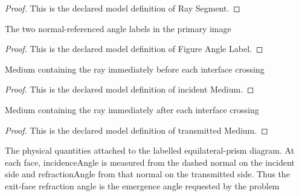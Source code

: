 \begin{proof}
  This is the declared model definition of Ray Segment.
\end{proof}
\begin{definition}
  \label{def:physics:phyx-mini-0146:phyxminiproblems-problemphyxmini0146-figureanglelabel}
  The two normal-referenced angle labels in the primary image
\end{definition}
\begin{proof}
  This is the declared model definition of Figure Angle Label.
\end{proof}
\begin{definition}
  \label{def:physics:phyx-mini-0146:phyxminiproblems-problemphyxmini0146-incidentmedium}
  Medium containing the ray immediately before each interface crossing
\end{definition}
\begin{proof}
  This is the declared model definition of incident Medium.
\end{proof}
\begin{definition}
  \label{def:physics:phyx-mini-0146:phyxminiproblems-problemphyxmini0146-transmittedmedium}
  Medium containing the ray immediately after each interface crossing
\end{definition}
\begin{proof}
  This is the declared model definition of transmitted Medium.
\end{proof}
\begin{definition}
  \label{def:physics:phyx-mini-0146:phyxminiproblems-problemphyxmini0146-equilateralglassprismdiagram}
  The physical quantities attached to the labelled equilateral-prism diagram. At each face, incidenceAngle is measured from the dashed normal on the incident side and refractionAngle from that normal on the transmitted side. Thus the exit-face refraction angle is the emergence angle requested by the problem
\end{definition}
